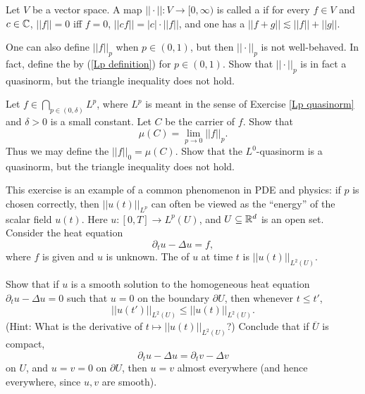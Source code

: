 \begin{definition}
Let $V$ be a vector space.
A map $||\cdot||: V \to [0, \infty)$ is called a  if for every $f \in V$ and $c \in \mathbb{C}$, $||f|| = 0$ iff $f = 0$, $||cf|| = |c|\cdot||f||$, and one has a  $||f + g|| \lesssim ||f|| + ||g||$.
\end{definition}

\begin{exercise}
\label{Lp quasinorm}
One can also define $||f||_{p} $ when $p \in (0, 1)$, but then $||\cdot||_{p} $ is not well-behaved.
In fact, define the  by (\ref{Lp definition}) for $p \in (0, 1)$.
Show that $||\cdot||_{p} $ is in fact a quasinorm, but the triangle inequality does not hold.
\end{exercise}

\begin{exercise}
Let $f \in \bigcap_{p \in (0, \delta)} L^p$, where $L^p$ is meant in the sense of Exercise \ref{Lp quasinorm} and $\delta > 0$ is a small constant.
Let $C$ be the carrier of $f$. Show that
\[\mu(C) = \lim_{p \to 0} ||f||_{p} .\]
Thus we may define the  $||f||_0 = \mu(C)$.
Show that the $L^0$-quasinorm is a quasinorm, but the triangle inequality does not hold.
\end{exercise}

\begin{exercise}
This exercise is an example of a common phenomenon in PDE and physics: if $p$ is chosen correctly, then $||u(t)||_{L^p}$ can often be viewed as the ``energy'' of the scalar field $u(t)$. Here $u: [0, T] \to L^p(U)$, and $U \subseteq \mathbb{R}^d$ is an open set.
Consider the heat equation
\[\partial_{t} u - \Delta u = f,\]
where $f$ is given and $u$ is unknown. The  of $u$ at time $t$ is $||u(t)||_{L^2(U)}$.

Show that if $u$ is a smooth solution to the homogeneous heat equation $\partial_{t} u - \Delta u = 0$ such that $u = 0$ on the boundary $\partial U$, then whenever $t \leq t'$,
\[||u(t')||_{L^2(U)} \leq ||u(t)||_{L^2(U)}.\]
(Hint: What is the derivative of $t \mapsto ||u(t)||_{L^2(U)}$?)
Conclude that if $\overline U$ is compact,
\[\partial_{t} u - \Delta u = \partial_{t} v - \Delta v\]
on $U$, and $u = v = 0$ on $\partial U$, then $u = v$ almost everywhere (and hence everywhere, since $u,v$ are smooth).
\end{exercise}


